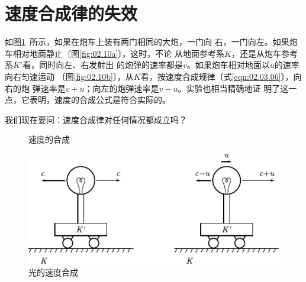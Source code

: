 \section{速度合成律的失效}\label{sec:02.06}

如图\ref{fig:02.10}~所示，如果在炮车上装有两门相同的大炮，一门向
右，一门向左。如果炮车相对地面静止〔图\ref{fig:02.10a}〕，这时，不论
从地面参考系$K$，还是从炮车参考系$K'$看，同时向左、右发射出
的炮弹的速率都是$v$。如果炮车相对地面以$u$的速率向右匀速运动
〔图\ref{fig:02.10b}〕，从$K$看，按速度合成规律〔式\eqref{eqn:02.03.06}〕，向右的炮
弹速率是$v+u$；向左的炮弹速率是$v-u$。实验也相当精确地证
明了这一点，它表明，速度的合成公式是符合实际的。

我们现在要问：速度合成律对任何情况都成立吗？

\clearpage
\begin{figure}
    \centering
    \hspace{2em}
    \caption{速度的合成}
    \label{fig:02.10}
\end{figure}

\begin{figure}
    \centering
    \includegraphics{figure/fig02.11}
    \caption{光的速度合成}
    \label{fig:02.11}
\end{figure}

